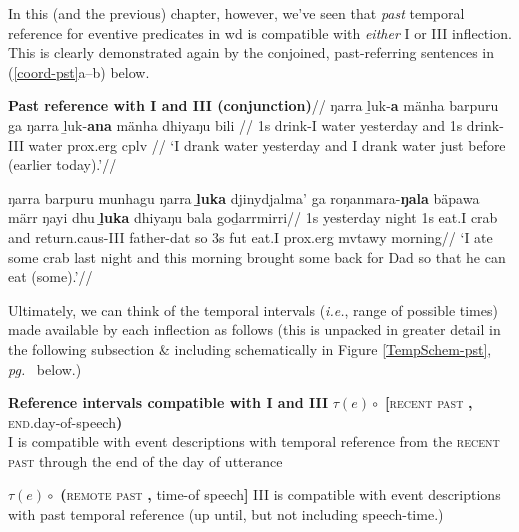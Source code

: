 In this (and the previous) chapter, however, we've seen that \textit{past} temporal reference for eventive predicates in \gls{wd} is compatible with \textit{either} \gls{I} or \gls{III} inflection. This is clearly demonstrated again by the conjoined, past-referring sentences in (\ref{coord-pst}a--b) below.

\pex\glpreamble \textbf{Past reference with \gls{I} and \gls{III} (conjunction)}\label{coord-pst}//
\a\begingl\gla \nogloss{[} ŋarra ḻuk-\textbf{a} mänha barpuru \nogloss{]} ga \nogloss{[} ŋarra ḻuk-\textbf{ana} mänha dhiyaŋu bili \nogloss{]}//
\glb 1s drink-\gls{I} water yesterday and 1s drink-\gls{III} water \gls{prox}.\gls{erg} \gls{cplv} //
\glft`I drank water yesterday and I drank water just before (earlier today).'\trailingcitation{[DB~20190405]}//\endgl


\a\begingl\gla ŋarra barpuru munhagu ŋarra \textbf{ḻuka} djinydjalma' ga roŋanmara-\textbf{ŋala} bäpawa märr ŋayi dhu \textbf{ḻuka} dhiyaŋu bala goḏarrmirri//
\glb 1s yesterday night 1s eat.\gls{I} crab and return.\gls{caus}-\gls{III} father-\gls{dat} so 3s \gls{fut} eat.\gls{I} \gls{prox}.\gls{erg} \gls{mvtawy} morning//
\glft`I ate some crab last night and this morning brought some back for Dad so that he can eat (some).'\trailingcitation{[DB~20190416]}//\endgl

\xe



Ultimately, we can think of the temporal intervals (\textit{i.e.}, range of possible times) made available by each inflection as follows (this is unpacked in greater detail in the following subsection \& including schematically in Figure \ref{TempSchem-pst}, \textit{pg.}~\pageref{TempSchem-pst} below.) 

\pex[labelformat=A] \textbf{Reference intervals compatible with \gls{I} and \gls{III}}
	\a[label=\textbf{\phantom{I}\gls{I}\phantom{I}}]$ \tau(e) \circ$ \textbf{[}\textsc{recent past} \textbf{,} \textsc{end}.day-of-speech\textbf{)}\\
	\gls{I} is compatible with event descriptions with temporal reference from the \textsc{recent past} through the end of the day of utterance
	
	\a[label=\gls{III}]$ \tau(e) \circ$ \textbf{(}\textsc{remote past} \textbf{,} time-of speech\textbf{]} 
	\gls{III} is compatible with event descriptions with past temporal reference (up until, but not including speech-time.)
	
\xe

